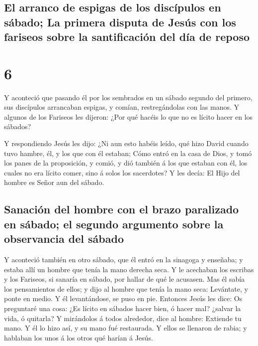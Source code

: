 \hypertarget{el-arranco-de-espigas-de-los-discuxedpulos-en-suxe1bado-la-primera-disputa-de-jesuxfas-con-los-fariseos-sobre-la-santificaciuxf3n-del-duxeda-de-reposo}{%
\subsection{El arranco de espigas de los discípulos en sábado; La
primera disputa de Jesús con los fariseos sobre la santificación del día
de
reposo}\label{el-arranco-de-espigas-de-los-discuxedpulos-en-suxe1bado-la-primera-disputa-de-jesuxfas-con-los-fariseos-sobre-la-santificaciuxf3n-del-duxeda-de-reposo}}

\hypertarget{section-5}{%
\section{6}\label{section-5}}

 Y aconteció que pasando él por los sembrados en un sábado
segundo del primero, sus discípulos arrancaban espigas, y comían,
restregándolas con las manos.  Y algunos de los Fariseos
les dijeron: ¿Por qué hacéis lo que no es lícito hacer en los sábados?

 Y respondiendo Jesús les dijo: ¿Ni aun esto habéis leído,
qué hizo David cuando tuvo hambre, él, y los que con él estaban;
 Cómo entró en la casa de Dios, y tomó los panes de la
proposición, y comió, y dió también á los que estaban con él, los cuales
no era lícito comer, sino á solos los sacerdotes?  Y les
decía: El Hijo del hombre es Señor aun del sábado.

\hypertarget{sanaciuxf3n-del-hombre-con-el-brazo-paralizado-en-suxe1bado-el-segundo-argumento-sobre-la-observancia-del-suxe1bado}{%
\subsection{Sanación del hombre con el brazo paralizado en sábado; el
segundo argumento sobre la observancia del
sábado}\label{sanaciuxf3n-del-hombre-con-el-brazo-paralizado-en-suxe1bado-el-segundo-argumento-sobre-la-observancia-del-suxe1bado}}

 Y aconteció también en otro sábado, que él entró en la
sinagoga y enseñaba; y estaba allí un hombre que tenía la mano derecha
seca.  Y le acechaban los escribas y los Fariseos, si
sanaría en sábado, por hallar de qué le acusasen.  Mas él
sabía los pensamientos de ellos; y dijo al hombre que tenía la mano
seca: Levántate, y ponte en medio. Y él levantándose, se puso en pie.
 Entonces Jesús les dice: Os preguntaré una cosa: ¿Es
lícito en sábados hacer bien, ó hacer mal? ¿salvar la vida, ó quitarla?
 Y mirándolos á todos alrededor, dice al hombre: Extiende
tu mano. Y él lo hizo así, y su mano fué restaurada.  Y
ellos se llenaron de rabia; y hablaban los unos á los otros qué harían á
Jesús.

